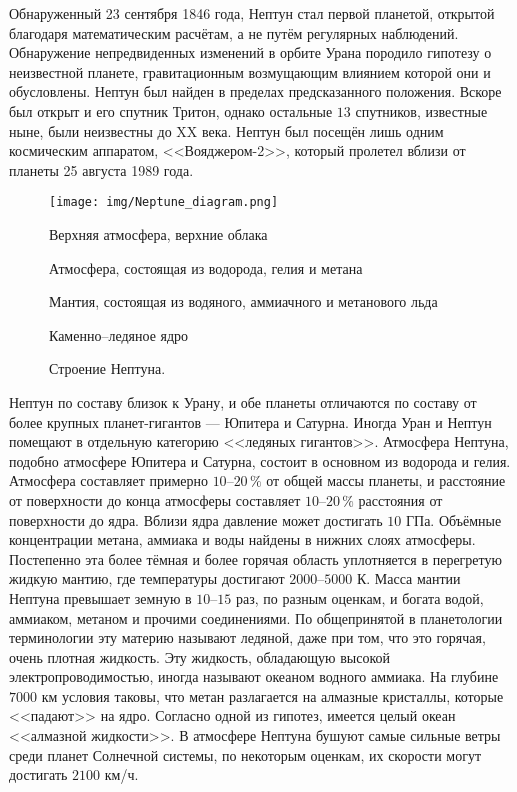 \documentclass[12pt]{article}
\numberwithin{equation}{section} %
\theoremstyle{definition}\newtheorem{defi}{Определение}
\newenvironment{note_enum}{%
\begin{framed}
  \noindent\setlength{\parindent}{0cm}
  \begin{small}
  \begin{enumerate}
}{%
  \end{enumerate}
  \end{small}
\end{framed}
}
\begin{document}
Обнаруженный 23 сентября 1846 года, Нептун стал первой планетой, открытой благодаря математическим расчётам, а не путём регулярных наблюдений. Обнаружение непредвиденных изменений в орбите Урана породило гипотезу о неизвестной планете, гравитационным возмущающим влиянием которой они и обусловлены. Нептун был найден в пределах предсказанного положения. Вскоре был открыт и его спутник Тритон, однако остальные $13$ спутников, известные ныне, были неизвестны до XX века. Нептун был посещён лишь одним космическим аппаратом, <<Вояджером-2>>, который пролетел вблизи от планеты 25 августа 1989 года.


\begin{wrapfigure}{r}{0.4\textwidth}
  \vspace{-1pc}
  \center \texttt{[image: img/Neptune\_diagram.png]}
  \caption{Строение Нептуна.}
  \vspace{-1pc}
  \begin{note_enum}
    \item Верхняя атмосфера, верхние облака
    \item Атмосфера, состоящая из водорода, гелия и метана
    \item Мантия, состоящая из водяного, аммиачного и метанового льда
    \item Каменно--ледяное ядро
  \end{note_enum}
\end{wrapfigure}

Нептун по составу близок к Урану, и обе планеты отличаются по составу от более крупных планет-гигантов — Юпитера и Сатурна. Иногда Уран и Нептун помещают в отдельную категорию <<ледяных гигантов>>. Атмосфера Нептуна, подобно атмосфере Юпитера и Сатурна, состоит в основном из водорода и гелия. Атмосфера составляет примерно $10$--$20\,\%$ от общей массы планеты, и расстояние от поверхности до конца атмосферы составляет $10$--$20\,\%$ расстояния от поверхности до ядра. Вблизи ядра давление может достигать $10$ ГПа. Объёмные концентрации метана, аммиака и воды найдены в нижних слоях атмосферы. Постепенно эта более тёмная и более горячая область уплотняется в перегретую жидкую мантию, где температуры достигают $2000$--$5000$ К. Масса мантии Нептуна превышает земную в $10$--$15$ раз, по разным оценкам, и богата водой, аммиаком, метаном и прочими соединениями. По общепринятой в планетологии терминологии эту материю называют ледяной, даже при том, что это горячая, очень плотная жидкость. Эту жидкость, обладающую высокой электропроводимостью, иногда называют океаном водного аммиака. На глубине $7000$ км условия таковы, что метан разлагается на алмазные кристаллы, которые <<падают>> на ядро. Согласно одной из гипотез, имеется целый океан <<алмазной жидкости>>. В атмосфере Нептуна бушуют самые сильные ветры среди планет Солнечной системы, по некоторым оценкам, их скорости могут достигать $2100$ км/ч.
\end{document}
